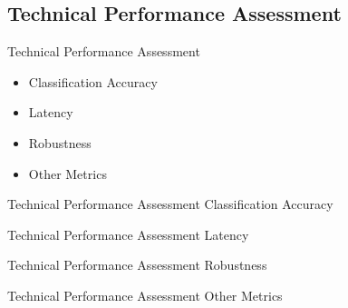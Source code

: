\subsection*{Technical Performance Assessment}
\begin{frame}{Technical Performance Assessment}
    \begin{itemize}
        \item Classification Accuracy
        \item Latency
        \item Robustness
        \item Other Metrics
    \end{itemize}
\end{frame}

\begin{frame}{Technical Performance Assessment \textemdash{} Classification Accuracy}
\end{frame}
\begin{frame}{Technical Performance Assessment \textemdash{} Latency}
    
\end{frame}
\begin{frame}{Technical Performance Assessment \textemdash{} Robustness}

\end{frame}
\begin{frame}{Technical Performance Assessment \textemdash{} Other Metrics}

\end{frame}
